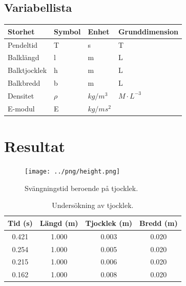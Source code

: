 \documentclass[10pt, titlepage, oneside, a4paper]{article}
\begin{document}
        \subsection{Variabellista}
        \begin{table}[h]
            \begin{tabular}{llll}

            \textbf{Storhet} & \textbf{Symbol} & \textbf{Enhet} & \textbf{Grunddimension} \\ \hline
            Pendeltid    & T    & s     & T         \\ \hline
            Balklängd    & l    & m     & L         \\ \hline
            Balktjocklek & h    & m     & L         \\ \hline
            Balkbredd    & b    & m     & L         \\ \hline
            Densitet     & $\rho$    & $kg/m^3$ & $M\cdot L^{-3}$     \\ \hline
            E-modul      & E      & \footnotesize $kg/ms^2$    &                \\ \hline
            \end{tabular}
        \end{table} 
        
	\section{Resultat}
    \begin{figure}[H]
        \centering
        \texttt{[image: ../png/height.png]}
        \caption{Svängningstid beroende på tjocklek.}
        \label{height}
    \end{figure}

    \begin{table}[H]
        \caption{Undersökning av tjocklek.}
        \begin{center}
            \begin{tabular}{cccc}
                \hline
                Tid (s) & Längd (m) & Tjocklek (m) & Bredd (m)\\
                \hline
                0.421 & 1.000 & 0.003 & 0.020\\
                0.254 & 1.000 & 0.005 & 0.020\\
                0.215 & 1.000 & 0.006 & 0.020\\
                0.162 & 1.000 & 0.008 & 0.020\\
            \end{tabular}
        \end{center}
    \end{table}
\end{document}
